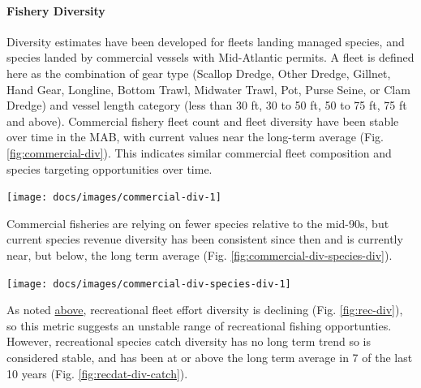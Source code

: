 \documentclass[
  10pt,
]{article}
\let\origfigure\figure
\let\endorigfigure\endfigure
\renewenvironment{figure}[1][2] {
    \expandafter\origfigure\expandafter[H]
} {
    \endorigfigure
}
\begin{document}
\hypertarget{fishery-diversity}{%
\paragraph{Fishery Diversity}\label{fishery-diversity}}

Diversity estimates have been developed for fleets landing managed
species, and species landed by commercial vessels with Mid-Atlantic
permits. A fleet is defined here as the combination of gear type
(Scallop Dredge, Other Dredge, Gillnet, Hand Gear, Longline, Bottom
Trawl, Midwater Trawl, Pot, Purse Seine, or Clam Dredge) and vessel
length category (less than 30 ft, 30 to 50 ft, 50 to 75 ft, 75 ft and
above). Commercial fishery fleet count and fleet diversity have been
stable over time in the MAB, with current values near the long-term
average (Fig. \ref{fig:commercial-div}). This indicates similar
commercial fleet composition and species targeting opportunities over
time.

\begin{figure}

{\centering \texttt{[image: docs/images/commercial-div-1]} 

}

\caption{Commercial fleet count and diversity in the Mid-Atlantic.}\label{fig:commercial-div}
\end{figure}

Commercial fisheries are relying on fewer species relative to the
mid-90s, but current species revenue diversity has been consistent since
then and is currently near, but below, the long term average (Fig.
\ref{fig:commercial-div-species-div}).

\begin{figure}

{\centering \texttt{[image: docs/images/commercial-div-species-div-1]} 

}

\caption{Species revenue diversity in the Mid-Atlantic.}\label{fig:commercial-div-species-div}
\end{figure}

As noted \protect\hyperlink{recreational-opportunities}{above},
recreational fleet effort diversity is declining (Fig.
\ref{fig:rec-div}), so this metric suggests an unstable range of
recreational fishing opportunties. However, recreational species catch
diversity has no long term trend so is considered stable, and has been
at or above the long term average in 7 of the last 10 years (Fig.
\ref{fig:recdat-div-catch}).
\end{document}
